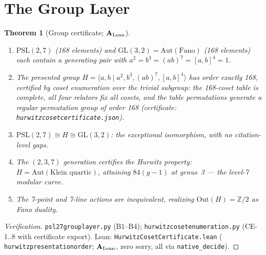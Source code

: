 \documentclass[11pt]{article}
\newtheorem{theorem}{Theorem}[section]
\theoremstyle{remark}
\newcommand{\lean}[1]{%
  \penalty-100
  \begingroup\def\_{\textunderscore\allowbreak}\texttt{#1}\endgroup}
\newcommand{\CatAL}{\ensuremath{\textbf{A}_{\rm Lean}}}
\begin{document}
\section{The Group Layer}
\label{sec:group}

\begin{theorem}[Group certificate; \CatAL]
\label{thm:C}
\begin{enumerate}[label=(\alph*),noitemsep]
  \item $\mathrm{PSL}(2,7)$ (168 elements) and $\mathrm{GL}(3,2) = \mathrm{Aut}(\mathrm{Fano})$ (168 elements)
        each contain a generating pair with $a^2 = b^3 = (ab)^7 = [a,b]^4 = 1$.
  \item The presented group $H = \langle a,b \mid a^2, b^3, (ab)^7, [a,b]^4\rangle$
        has order \emph{exactly} 168, certified by coset enumeration over the
        trivial subgroup: the 168-coset table is complete, all four relators
        fix all cosets, and the table permutations generate a regular permutation
        group of order 168 (certificate: \lean{hurwitz\_coset\_certificate.json}).
  \item $\mathrm{PSL}(2,7)\cong H\cong\mathrm{GL}(3,2)$: the exceptional
        isomorphism, with no citation-level gaps.
  \item The $(2,3,7)$ generation certifies the Hurwitz property:
        $H = \mathrm{Aut}(\text{Klein quartic})$, attaining $84(g-1)$ at
        genus~3 --- the level-7 modular curve.
  \item The 7-point and 7-line actions are inequivalent, realizing
        $\mathrm{Out}(H) = \mathbb{Z}/2$ as Fano duality.
\end{enumerate}
\end{theorem}

\begin{proof}[Verification]
\lean{psl27\_group\_layer.py} (B1--B4); \lean{hurwitz\_coset\_enumeration.py}
(CE-1..8 with certificate export). Lean: \lean{HurwitzCosetCertificate.lean}
(\lean{hurwitz\_presentation\_order\_168}; \CatAL, zero sorry, all via
\texttt{native\_decide}).
\end{proof}
\end{document}
